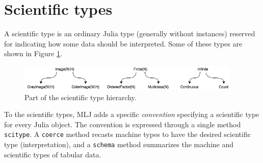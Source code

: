 \documentclass{article}
\begin{document}
\section{Scientific types}

A scientific type is an ordinary Julia type (generally without
instances) reserved for indicating how some data should be
interpreted. Some of these types are shown in Figure \ref{fig:fig1}.

\begin{figure}
  \centering
  \includegraphics[width=0.95\textwidth]{scitypesII}
  \caption{Part of the scientific type hierarchy.}
  \label{fig:fig1}
\end{figure}

To the scientific types, MLJ adds a specific \textit{convention}
specifying a scientific type for every Julia object. The convention is
expressed through a single method \texttt{scitype}. A \texttt{coerce}
method recasts machine types to have the desired scientific type
(interpretation), and a \texttt{schema} method summarizes the machine
and scientific types of tabular data.







\end{document}
